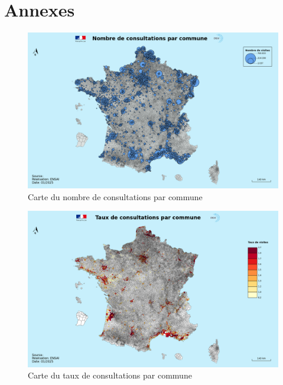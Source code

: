 \documentclass[
]{article}
\begin{document}
\section{Annexes}\label{annexes}

\begin{figure}
    \centering
    \includegraphics[width=1\linewidth]{../cartes/nombre_de_consulatations}
    \caption{Carte du nombre de consultations par commune}
    \label{fig:figure}
\end{figure}
\begin{figure}
    \centering
    \includegraphics[width=1\linewidth]{../cartes/taux_de_consultations}
    \caption{Carte du taux de consultations par commune}
    \label{fig:figure}
\end{figure}
\end{document}
